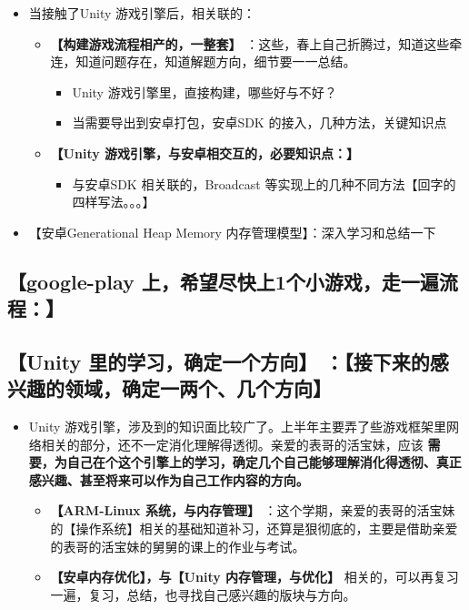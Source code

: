 \documentclass[9pt, b5paper]{article}
\begin{document}
\begin{itemize}
\item 当接触了Unity 游戏引擎后，相关联的： 
\begin{itemize}
\item \textbf{【构建游戏流程相产的，一整套】} ：这些，春上自己折腾过，知道这些牵连，知道问题存在，知道解题方向，细节要一一总结。
\begin{itemize}
\item Unity 游戏引擎里，直接构建，哪些好与不好？
\item 当需要导出到安卓打包，安卓SDK 的接入，几种方法，关键知识点
\end{itemize}
\item \textbf{【Unity 游戏引擎，与安卓相交互的，必要知识点：】}
\begin{itemize}
\item 与安卓SDK 相关联的，Broadcast 等实现上的几种不同方法【回字的四样写法。。。】
\end{itemize}
\end{itemize}
\item 【安卓Generational Heap Memory 内存管理模型】：深入学习和总结一下
\end{itemize}
\subsection{\textbf{【google-play 上，希望尽快上1个小游戏，走一遍流程：】}}
\label{sec-1-4}
\subsection{\textbf{【Unity 里的学习，确定一个方向】} ：【接下来的感兴趣的领域，确定一两个、几个方向】}
\label{sec-1-5}
\begin{itemize}
\item Unity 游戏引擎，涉及到的知识面比较广了。上半年主要弄了些游戏框架里网络相关的部分，还不一定消化理解得透彻。亲爱的表哥的活宝妹，应该 \textbf{需要，为自己在个这个引擎上的学习，确定几个自己能够理解消化得透彻、真正感兴趣、甚至将来可以作为自己工作内容的方向。}
\begin{itemize}
\item \textbf{【ARM-Linux 系统，与内存管理】} ：这个学期，亲爱的表哥的活宝妹的【操作系统】相关的基础知道补习，还算是狠彻底的，主要是借助亲爱的表哥的活宝妹的舅舅的课上的作业与考试。
\item \textbf{【安卓内存优化】，与【Unity 内存管理，与优化】} 相关的，可以再复习一遍，复习，总结，也寻找自己感兴趣的版块与方向。
\end{itemize}
\end{itemize}
\end{document}
